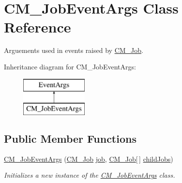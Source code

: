\hypertarget{class_c_m___job_event_args}{}\section{C\+M\+\_\+\+Job\+Event\+Args Class Reference}
\label{class_c_m___job_event_args}


Arguements used in events raised by \hyperlink{class_c_m___job}{C\+M\+\_\+\+Job}.  


Inheritance diagram for C\+M\+\_\+\+Job\+Event\+Args\+:\begin{figure}[H]
\begin{center}
\leavevmode
\includegraphics[height=2.000000cm]{class_c_m___job_event_args}
\end{center}
\end{figure}
\subsection*{Public Member Functions}
\begin{DoxyCompactItemize}
\item 
\hyperlink{class_c_m___job_event_args_a31a12f7cf24666f25f6b0967668cff61}{C\+M\+\_\+\+Job\+Event\+Args} (\hyperlink{class_c_m___job}{C\+M\+\_\+\+Job} \hyperlink{class_c_m___job_event_args_a602ecf7364ca2e6a2285f1622e7f1c8b}{job}, \hyperlink{class_c_m___job}{C\+M\+\_\+\+Job}\mbox{[}$\,$\mbox{]} \hyperlink{class_c_m___job_event_args_a6b20e99da0cb8807604b4459eebb4484}{child\+Jobs})
\begin{DoxyCompactList}\small\item\em Initializes a new instance of the \hyperlink{class_c_m___job_event_args}{C\+M\+\_\+\+Job\+Event\+Args} class. \end{DoxyCompactList}\end{DoxyCompactItemize}
